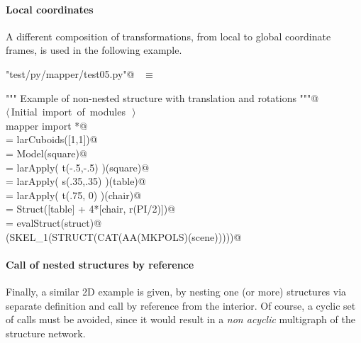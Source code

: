 \documentclass[11pt,oneside]{article}	%
\begin{document}
\paragraph{Local coordinates}
A different composition of transformations, from local to global coordinate frames, is used in the following example.

\begin{flushleft} \small \label{scrap39}
\verb@"test/py/mapper/test05.py"@\nobreak\ {\footnotesize {} }$\equiv$
\vspace{-1ex}
\begin{list}{}{} \item
\mbox{}\verb@""" Example of non-nested structure with translation and rotations """@\\
\mbox{}\verb@@\hbox{$\langle\,$Initial import of modules\nobreak\ {\footnotesize {}}$\,\rangle$}\verb@@\\
\mbox{}\verb@from mapper import *@\\
\mbox{}\verb@square = larCuboids([1,1])@\\
\mbox{}\verb@square = Model(square)@\\
\mbox{}\verb@table = larApply( t(-.5,-.5) )(square)@\\
\mbox{}\verb@chair = larApply( s(.35,.35) )(table)@\\
\mbox{}\verb@chair = larApply( t(.75, 0) )(chair)@\\
\mbox{}\verb@struct = Struct([table] + 4*[chair, r(PI/2)])@\\
\mbox{}\verb@scene = evalStruct(struct)@\\
\mbox{}\verb@VIEW(SKEL_1(STRUCT(CAT(AA(MKPOLS)(scene)))))@\\
\mbox{}\verb@@{\NWsep}
\end{list}
\vspace{-2ex}
\end{flushleft}

\paragraph{Call of nested structures by reference}
Finally, a similar 2D example is given, by nesting one (or more) structures via separate definition and call by reference from the interior. Of course, a cyclic set of calls must be avoided, since it would result in a \emph{non acyclic} multigraph of the structure network.
\end{document}
